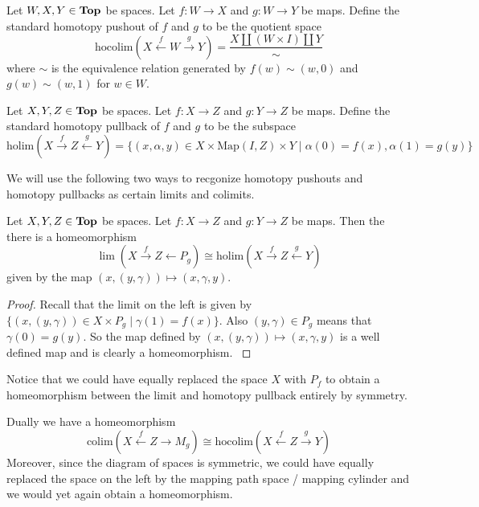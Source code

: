 \begin{defn}\label{defn:Hpull} Let $W,X,Y\in\bold{Top}$ be spaces. Let $f:W\to X$ and $g:W\to Y$ be maps. Define the standard homotopy pushout of $f$ and $g$ to be the quotient space $$\text{hocolim}(X\overset{f}{\leftarrow}W\overset{g}{\rightarrow}Y)=\frac{X\amalg(W\times I)\amalg Y}{\sim}$$ where $\sim$ is the equivalence relation generated by $f(w)\sim (w,0)$ and $g(w)\sim(w,1)$ for $w\in W$. 
\end{defn}

\begin{defn}\label{defn:Hpush} Let $X,Y,Z\in\bold{Top}$ be spaces. Let $f:X\to Z$ and $g:Y\to Z$ be maps. Define the standard homotopy pullback of $f$ and $g$ to be the subspace $$\text{holim}(X\overset{f}{\rightarrow}Z\overset{g}{\leftarrow}Y)=\{(x,\alpha,y)\in X\times\text{Map}(I,Z)\times Y\;|\;\alpha(0)=f(x),\alpha(1)=g(y)\}$$
\end{defn}

We will use the following two ways to recgonize homotopy pushouts and homotopy pullbacks as certain limits and colimits. 

\begin{prp}\label{prp:Replace1} Let $X,Y,Z\in\bold{Top}$ be spaces. Let $f:X\to Z$ and $g:Y\to Z$ be maps. Then the there is a homeomorphism $$\lim(X\overset{f}{\rightarrow}Z\leftarrow P_g)\cong\text{holim}(X\overset{f}{\rightarrow}Z\overset{g}{\leftarrow}Y)$$ given by the map $(x,(y,\gamma))\mapsto(x,\gamma,y)$. 
\begin{proof}
Recall that the limit on the left is given by $\{(x,(y,\gamma))\in X\times P_g\;|\;\gamma(1)=f(x)\}$. Also $(y,\gamma)\in P_g$ means that $\gamma(0)=g(y)$. So the map defined by $(x,(y,\gamma))\mapsto(x,\gamma,y)$ is a well defined map and is clearly a homeomorphism. \cite{CHT}
\end{proof}
\end{prp}

Notice that we could have equally replaced the space $X$ with $P_f$ to obtain a homeomorphism between the limit and homotopy pullback entirely by symmetry.  

Dually we have a homeomorphism $$\text{colim}(X\overset{f}{\leftarrow}Z\rightarrow M_g)\cong\text{hocolim}(X\overset{f}{\leftarrow}Z\overset{g}{\rightarrow}Y)$$ Moreover, since the diagram of spaces is symmetric, we could have equally replaced the space on the left by the mapping path space / mapping cylinder and we would yet again obtain a homeomorphism. 

